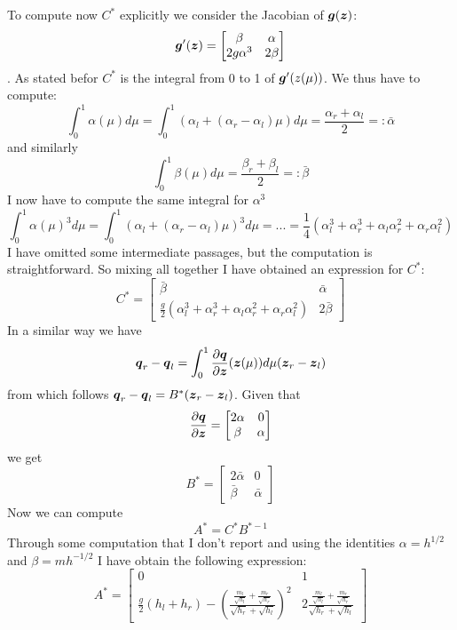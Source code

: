 \documentclass[oneside,12pt]{book}  %
\theoremstyle{plain}
\theoremstyle{definition}
\theoremstyle{remark}
\numberwithin{equation}{chapter} %
\begin{document}
To compute now $C^*$ explicitly we consider the Jacobian of
$\gg(\zz)$: $$\gg'(\zz)=\begin{bmatrix} \beta & \alpha \\ 2g\alpha^3
  & 2\beta \end{bmatrix}$$.
As stated befor $C^*$ is the integral from 0 to 1 of
$\gg'(\\z(\mu))$. We thus have to compute:
\begin{equation}
  \label{eq:alpha_integral}
  \int_0^1\alpha(\mu)d\mu=\int_0^1(\alpha_l+(\alpha_r-\alpha_l)\mu)d\mu=\frac{\alpha_r+\alpha_l}{2}=:\bar{\alpha}
\end{equation}
and similarly
\begin{equation}
  \label{eq:beta_integral}
  \int_0^1\beta(\mu)d\mu=\frac{\beta_r+\beta_l}{2}=:\bar{\beta}
\end{equation}
I now have to compute the same integral for $\alpha^3$
\begin{equation}
  \label{eq:alpha_cubic_integral}
  \int_0^1\alpha(\mu)^3d\mu=\int_0^1(\alpha_l+(\alpha_r-\alpha_l)\mu)^3d\mu=...=
  \frac{1}{4}(\alpha_l^3+\alpha_r^3+\alpha_l\alpha_r^2+\alpha_r\alpha_l^2)
\end{equation}
I have omitted some intermediate passages, but the computation is
straightforward. So mixing all together I have obtained an expression
for $C^*$:
\begin{equation}
  \label{eq:c_matrix}
  C^*=\begin{bmatrix} \bar{\beta} & \bar{\alpha} \\ \frac{g}{2} (\alpha_l^3+\alpha_r^3+\alpha_l\alpha_r^2+\alpha_r\alpha_l^2)
  & 2\bar{\beta} \end{bmatrix}
\end{equation}
\newline
In a similar way we have $$\qq_r-\qq_l=\int_0^1\frac{\partial
  \qq}{\partial \zz}(\zz(\mu))d\mu(\zz_r-\zz_l)$$
from which follows $\qq_r-\qq_l=B^*(\zz_r-\zz_l)$. Given
that $$\frac{\partial \qq}{\partial \zz}=\begin{bmatrix} 2\alpha & 0\\
  \beta & \alpha \end{bmatrix}$$ we get
\begin{equation}
  \label{eq:b_matrix}
  B^*=\begin{bmatrix} 2\bar\alpha & 0\\
  \bar\beta & \bar\alpha \end{bmatrix}
\end{equation}
Now we can compute $$A^*=C^*B^{*-1}$$ Through some computation that I
don't report and using the identities $\alpha=h^{1/2}$ and
$\beta=mh^{-1/2}$ I have obtain the following expression:
\begin{equation}
 \label{eq:a_matrix}
  A^*=\begin{bmatrix} 0 & 1\\
  \frac{g}{2}(h_l+h_r)- \left
    (\frac{\frac{m_l}{\sqrt{h_l}}+\frac{m_r}{\sqrt{h_r}}
    }{\sqrt{h_r}+\sqrt{h_l}} \right )^2& 
  2\frac{\frac{m_l}{\sqrt{h_l}}+\frac{m_r}{\sqrt{h_r}} }{\sqrt{h_r}+\sqrt{h_l}} \end{bmatrix}
\end{equation}
\end{document}
